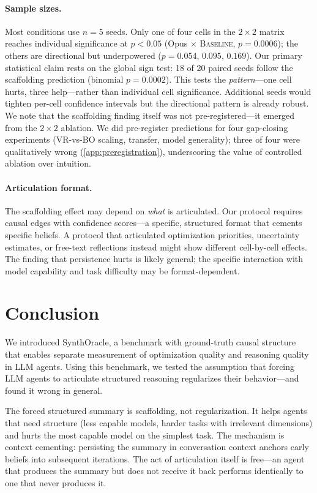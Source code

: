 \documentclass[11pt,letterpaper]{article}
\newcommand{\pval}[1]{\ensuremath{p = #1}}
\newcommand{\oracle}[1]{\textsc{#1}}
\newcommand{\baseline}{\oracle{Baseline}}
\begin{document}
\paragraph{Sample sizes.} Most conditions use $n = 5$ seeds. Only one
of four cells in the $2 \times 2$ matrix reaches individual significance
at $p < 0.05$ (Opus $\times$ \baseline{}, \pval{0.0006}); the others
are directional but underpowered ($p = 0.054$, $0.095$, $0.169$). Our
primary statistical claim rests on the global sign test: 18 of 20 paired
seeds follow the scaffolding prediction (binomial \pval{0.0002}). This
tests the \emph{pattern}---one cell hurts, three help---rather than
individual cell significance. Additional seeds would tighten per-cell
confidence intervals but the directional pattern is already robust.
We note that the scaffolding finding itself was not pre-registered---it
emerged from the $2 \times 2$ ablation. We did pre-register predictions
for four gap-closing experiments (VR-vs-BO scaling, transfer, model
generality); three of four were qualitatively wrong
(\cref{app:preregistration}), underscoring the value of controlled
ablation over intuition.

\paragraph{Articulation format.} The scaffolding effect may depend on
\emph{what} is articulated. Our protocol requires causal edges with
confidence scores---a specific, structured format that cements specific
beliefs. A protocol that articulated optimization priorities,
uncertainty estimates, or free-text reflections instead might show
different cell-by-cell effects. The finding that persistence hurts is
likely general; the specific interaction with model capability and task
difficulty may be format-dependent.

\section{Conclusion}
\label{sec:conclusion}

We introduced SynthOracle, a benchmark with ground-truth causal
structure that enables separate measurement of optimization quality and
reasoning quality in LLM agents. Using this benchmark, we tested the
assumption that forcing LLM agents to articulate structured reasoning
regularizes their behavior---and found it wrong in general.

The forced structured summary is scaffolding, not regularization. It
helps agents that need structure (less capable models, harder tasks with
irrelevant dimensions) and hurts the most capable model on the simplest
task. The mechanism is context cementing: persisting the summary in
conversation context anchors early beliefs into subsequent iterations.
The act of articulation itself is free---an agent that produces the
summary but does not receive it back performs identically to one that
never produces it.
\end{document}
